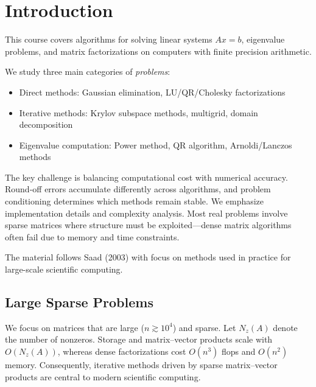 \chapter{Introduction}

This course covers algorithms for solving linear systems $Ax = b$, eigenvalue problems, and matrix factorizations on computers with finite precision arithmetic.

We study three main categories of \emph{problems}:
\begin{itemize}
    \item Direct methods: Gaussian elimination, LU/QR/Cholesky factorizations
    \item Iterative methods: Krylov subspace methods, multigrid, domain decomposition
    \item Eigenvalue computation: Power method, QR algorithm, Arnoldi/Lanczos methods
\end{itemize}

The key challenge is balancing computational cost with numerical accuracy. Round-off errors accumulate differently across algorithms, and problem conditioning determines which methods remain stable.
We emphasize implementation details and complexity analysis. Most real problems involve sparse matrices where structure must be exploited—dense matrix algorithms often fail due to memory and time constraints.

The material follows Saad (2003) with focus on methods used in practice for large-scale scientific computing.

\section{Large Sparse Problems}
We focus on matrices that are large ($n\gtrsim 10^4$) and sparse. Let $N_z(A)$ denote the number of nonzeros. Storage and matrix--vector products scale with $O(N_z(A))$, whereas dense factorizations cost $O(n^3)$ flops and $O(n^2)$ memory. Consequently, iterative methods driven by sparse matrix--vector products are central to modern scientific computing.

